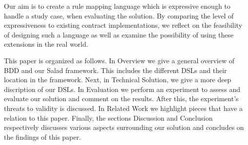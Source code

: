 Our aim is to create a rule mapping language which is expressive enough to handle a study case, when evaluating the solution.
By comparing the level of expressiveness to existing contract implementations, 
we reflect on the feasibility of designing such a language as well as examine the possibility of using these extensions in the real world.

This paper is organized as follows.
In Overview we give a general overview of BDD and our Salad framework.
This includes the different DSLs and their location in the framework.
Next, in Technical Solution, we give a more deep discription of our DSLs.
In Evaluation we perform an experiment to assess and evaluate our solution and comment on the results.
After this, the experiment's threats to validity is discussed.
In Related Work we highlight pieces that have a relation to this paper.
Finally, the sections Discussion and Conclusion respectively discusses various aspects surrounding our solution and concludes on the findings of this paper.


